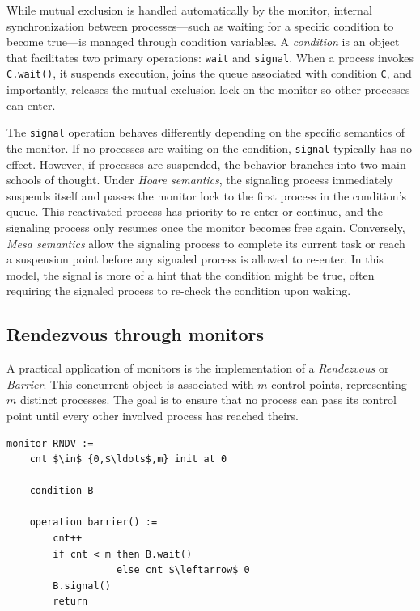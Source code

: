 While mutual exclusion is handled automatically by the monitor, internal synchronization between processes—such as waiting for a specific condition to become true—is managed through condition variables. A \textit{condition} is an object that facilitates two primary operations: \texttt{wait} and \texttt{signal}. When a process invokes \texttt{C.wait()}, it suspends execution, joins the queue associated with condition \texttt{C}, and importantly, releases the mutual exclusion lock on the monitor so other processes can enter.

The \texttt{signal} operation behaves differently depending on the specific semantics of the monitor. If no processes are waiting on the condition, \texttt{signal} typically has no effect. However, if processes are suspended, the behavior branches into two main schools of thought. Under \textit{Hoare semantics}, the signaling process immediately suspends itself and passes the monitor lock to the first process in the condition’s queue. This reactivated process has priority to re-enter or continue, and the signaling process only resumes once the monitor becomes free again. Conversely, \textit{Mesa semantics} allow the signaling process to complete its current task or reach a suspension point before any signaled process is allowed to re-enter. In this model, the signal is more of a hint that the condition might be true, often requiring the signaled process to re-check the condition upon waking.

\subsection{Rendezvous through monitors}
A practical application of monitors is the implementation of a \textit{Rendezvous} or \textit{Barrier}. This concurrent object is associated with $m$ control points, representing $m$ distinct processes. The goal is to ensure that no process can pass its control point until every other involved process has reached theirs.

\begin{minipage}{\textwidth}
\begin{lstlisting}[mathescape]
monitor RNDV :=
    cnt $\in$ {0,$\ldots$,m} init at 0
    
    condition B
    
    operation barrier() :=
        cnt++
        if cnt < m then B.wait()
                   else cnt $\leftarrow$ 0
        B.signal()
        return
\end{lstlisting}
\end{minipage}\\

